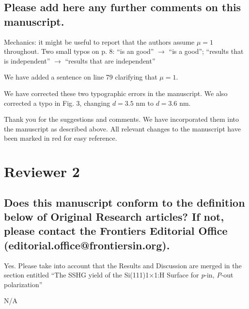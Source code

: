 \documentclass{article}
\begin{document}
\subsection{Please add here any further comments on this manuscript.}

Mechanics: it might be useful to report that the authors assume $\mu = 1$
throughout. Two small typos on p. 8: ``is an good'' $\rightarrow$ ``is a good'';
``results that is independent'' $\rightarrow$ ``results that are independent''

\begin{shaded}
We have added a sentence on line 79 clarifying that $\mu = 1$.

We have corrected these two typographic errors in the manuscript. We also corrected a typo in Fig. 3, changing $d = 3.5$ nm to $d = 3.6$ nm.

Thank you for the suggestions and comments. We have incorporated them into the manuscript as described above. All relevant changes to the manuscript have been marked in red for easy reference.
\end{shaded}



\section{Reviewer 2}
\setcounter{subsection}{0}


\subsection{Does this manuscript conform to the definition below of Original
Research articles? If not, please contact the Frontiers Editorial Office
(editorial.office@frontiersin.org).}

Yes. Please take into account that the Results and Discussion are merged in the
section entitled ``The SSHG yield of the Si(111)1$\times$1:H Surface for
\emph{p}-in, \emph{P}-out polarization''

\begin{shaded}
N/A
\end{shaded}
\end{document}
